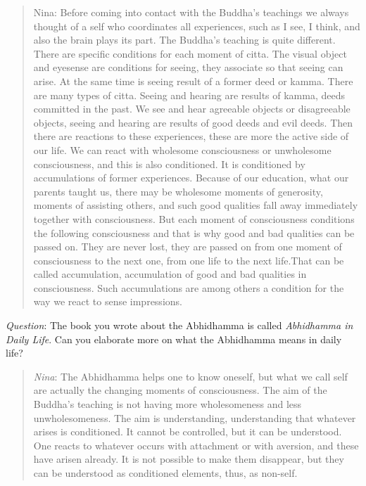 \documentclass[10pt,a4paper,oneside]{article}
\begin{document}
\begin{quote}
Nina: Before coming into contact with the Buddha’s teachings we always thought of a self who coordinates all experiences, such as I see, I think, and also the brain plays its part. The Buddha’s teaching is quite different. There are specific conditions for each moment of citta. The visual object and eyesense are conditions for seeing, they associate so that seeing can arise. At the same time is seeing result of a former deed or kamma. There are many types of citta. Seeing and hearing are results of kamma, deeds committed in the past. We see and hear agreeable objects or disagreeable objects, seeing and hearing are results of good deeds and evil deeds. Then there are reactions to these experiences, these are more the active side of our life. We can react with wholesome consciousness or unwholesome consciousness, and this is also conditioned. It is conditioned by accumulations of former experiences. Because of our education, what our parents taught us, there may be wholesome moments of generosity, moments of assisting others, and such good qualities fall away immediately together with consciousness. But each moment of consciousness conditions the following consciousness and that is why good and bad qualities can be passed on. They are never lost, they are passed on from one moment of consciousness to the next one, from one life to the next life.That can be called accumulation, accumulation of good and bad qualities in consciousness. Such accumulations are among others a condition for the way we react to sense impressions.
\end{quote}

\textit{Question}: The book you wrote about the Abhidhamma is called \textit{Abhidhamma in Daily Life}. Can you elaborate more on what the Abhidhamma means in daily life?

\begin{quote}
\textit{Nina}: The Abhidhamma helps one to know oneself, but what we call self are actually the changing moments of consciousness. The aim of the Buddha’s teaching is not having more wholesomeness and less unwholesomeness. The aim is understanding, understanding that whatever arises is conditioned. It cannot be controlled, but it can be understood. One reacts to whatever occurs with attachment or with aversion, and these have arisen already. It is not possible to make them disappear, but they can be understood as conditioned elements, thus, as non-self.
\end{quote}
\end{document}
